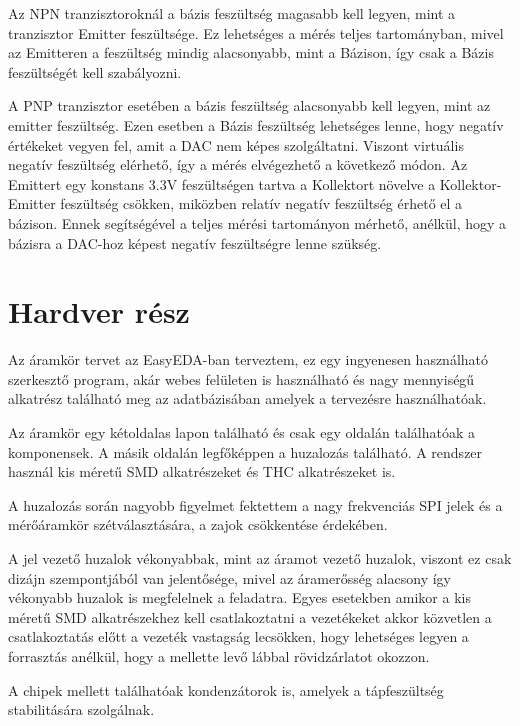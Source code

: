 Az NPN tranzisztoroknál a bázis feszültség
magasabb kell legyen, mint a tranzisztor Emitter feszültsége.
Ez lehetséges a mérés teljes tartományban, mivel az Emitteren a feszültség
mindig alacsonyabb, mint a Bázison, így csak a Bázis feszültségét kell
szabályozni.

A PNP tranzisztor esetében a bázis feszültség alacsonyabb kell legyen,
mint az emitter feszültség. Ezen esetben a Bázis feszültség lehetséges 
lenne, hogy negatív értékeket vegyen fel, amit a DAC nem képes szolgáltatni.
Viszont virtuális negatív feszültség elérhető, így a mérés elvégezhető 
a következő módon. Az Emittert egy konstans 3.3V feszültségen tartva a
Kollektort növelve a Kollektor-Emitter feszültség csökken, miközben
relatív negatív feszültség érhető el a bázison.
Ennek segítségével a teljes mérési tartományon mérhető, anélkül,
hogy a bázisra a DAC-hoz képest negatív feszültségre lenne szükség.



\section{Hardver rész}

Az áramkör tervet az EasyEDA-ban terveztem, ez egy ingyenesen használható szerkesztő
program, akár webes felületen is használható és nagy mennyiségű alkatrész található
meg az adatbázisában amelyek a tervezésre használhatóak.

Az áramkör egy kétoldalas lapon található és csak egy oldalán találhatóak a komponensek.
A másik oldalán legfőképpen a huzalozás található. A rendszer használ kis méretű
SMD alkatrészeket és THC alkatrészeket is. 

A huzalozás során nagyobb figyelmet fektettem a nagy frekvenciás SPI jelek
és a mérőáramkör szétválasztására, a zajok csökkentése érdekében.

A jel vezető huzalok vékonyabbak, mint az áramot vezető huzalok, viszont ez csak
dizájn szempontjából van jelentősége, mivel az áramerősség alacsony így vékonyabb
huzalok is megfelelnek a feladatra. Egyes esetekben amikor a kis méretű SMD 
alkatrészekhez kell csatlakoztatni a vezetékeket akkor közvetlen a csatlakoztatás
előtt a vezeték vastagság lecsökken, hogy lehetséges legyen a forrasztás anélkül,
hogy a mellette levő lábbal rövidzárlatot okozzon.

A chipek mellett találhatóak kondenzátorok is, amelyek a tápfeszültség stabilitására
szolgálnak.

